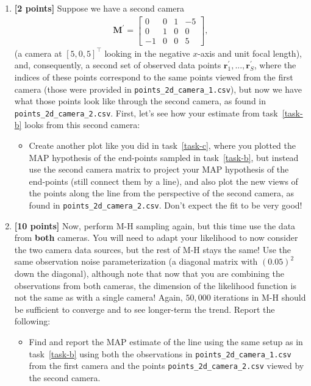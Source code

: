 \documentclass[10pt]{article}
\begin{document}
\begin{enumerate}
\item \label{task-e} {\bf [2 points]} Suppose we have a second camera
\begin{eqnarray*}
\mathbf{M}^{\prime} =
\begin{bmatrix}
0 & 0 & 1 & -5 \\
0 & 1 & 0 & 0 \\
-1 & 0 & 0 & 5
\end{bmatrix} ,
\end{eqnarray*}
(a camera at $[5, 0, 5]^{\top}$ looking in the negative $x$-axis and unit focal length), 
and, consequently, a second set of observed data points $\mathbf{r}^{\prime}_1, ..., \mathbf{r}^{\prime}_S$, where the indices of these points correspond to the same points viewed from the first camera (those were provided in {\tt points\_2d\_camera\_1.csv}), but now we have what those points look like through the second camera, as found in {\tt points\_2d\_camera\_2.csv}.  First, let's see how your estimate from task~\ref{task-b} looks from this second camera:
\begin{itemize}
\item Create another plot like you did in task~\ref{task-c}, where you plotted the MAP hypothesis of the end-points sampled in task~\ref{task-b}, but instead use the second camera matrix to project your MAP hypothesis of the end-points (still connect them by a line), and also plot the new views of the points along the line from the perspective of the second camera, as found in {\tt points\_2d\_camera\_2.csv}.  Don't expect the fit to be very good!


\end{itemize}

\item {\bf [10 points]} \label{task-f} Now, perform M-H sampling again, but this time use the data from {\bf both} cameras.  You will need to adapt your likelihood to now consider the two camera data sources, but the rest of M-H stays the same!  Use the same observation noise parameterization (a diagonal matrix with $(0.05)^2$ down the diagonal), although note that now that you are combining the observations from both cameras, the dimension of the likelihood function is not the same as with a single camera!  Again, $50,000$ iterations in M-H should be sufficient to converge and to see longer-term the trend.
Report the following:
\begin{itemize}
\item Find and report the MAP estimate of the line using the same setup as in task~\ref{task-b} using both the observations in {\tt points\_2d\_camera\_1.csv} from the first camera and the points {\tt points\_2d\_camera\_2.csv} viewed by the second camera.



\end{itemize}
\end{enumerate}
\end{document}
